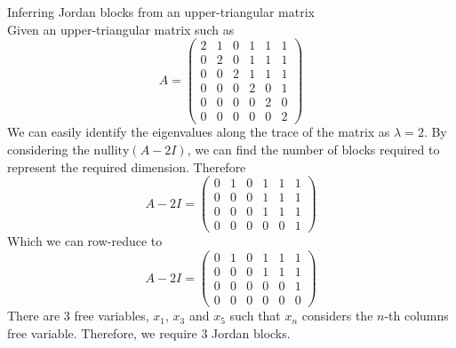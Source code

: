 \documentclass[journal, letterpaper]{IEEEtran}
\begin{document}
    \begin{mybox}{Inferring Jordan blocks from an upper-triangular matrix} \\ 
        Given an upper-triangular matrix such as
        $$
        A = \begin{pmatrix}
            2 & 1 & 0 & 1 & 1 & 1 \\
            0 & 2 & 0 & 1 & 1 & 1 \\ 
            0 & 0 & 2 & 1 & 1 & 1 \\ 
            0 & 0 & 0 & 2 & 0 & 1 \\
            0 & 0 & 0 & 0 & 2 & 0 \\
            0 & 0 & 0 & 0 & 0 & 2
        \end{pmatrix}
        $$
        We can easily identify the eigenvalues along the trace of the matrix as $\lambda = 2$. By considering the $\text{nullity}(A - 2 I)$, we can find the number of blocks required to represent the required dimension. Therefore
        $$
        A - 2I = \begin{pmatrix}
            0 & 1 & 0 & 1 & 1 & 1 \\ 
            0 & 0 & 0 & 1 & 1 & 1 \\
            0 & 0 & 0 & 1 & 1 & 1 \\
            0 & 0 & 0 & 0 & 0 & 1
        \end{pmatrix}
        $$
        Which we can row-reduce to
        $$
        A - 2I = \begin{pmatrix}
            0 & 1 & 0 & 1 & 1 & 1 \\ 
            0 & 0 & 0 & 1 & 1 & 1 \\
            0 & 0 & 0 & 0 & 0 & 1 \\
            0 & 0 & 0 & 0 & 0 & 0
        \end{pmatrix}
        $$       
        There are 3 free variables, $x_1$, $x_3$ and $x_5$ such that $x_n$ considers the $n$-th columns free variable. Therefore, we require
        3 Jordan blocks.
    \end{mybox}
\end{document}
